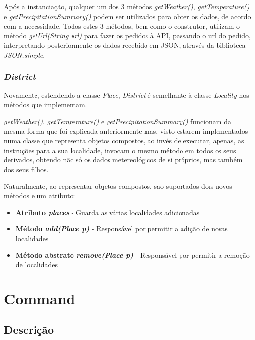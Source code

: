 \documentclass[10pt,portuguese]{article}
\begin{document}
\par Após a instanciação, qualquer um dos 3 métodos \textit{getWeather()}, \textit{getTemperature()} e \textit{getPrecipitationSummary()} podem ser utilizados para obter os dados, de acordo com a necessidade. Todos estes 3 métodos, bem como o construtor, utilizam o método \textit{getUrl(String url)} para fazer os pedidos à API, passando o url do pedido, interpretando posteriormente os dados recebido em JSON, através da biblioteca \textit{JSON.simple}. 

\subsubsection{\textit{District}}

\par Novamente, estendendo a classe \textit{Place}, \textit{District} é semelhante à classe \textit{Locality} nos métodos que implementam.

\par \textit{getWeather()}, \textit{getTemperature()} e \textit{getPrecipitationSummary()} funcionam da mesma forma que foi explicada anteriormente mas, visto estarem implementados numa classe que representa objetos compostos, ao invés de executar, apenas, as instruções para a sua localidade, invocam o mesmo método em todos os seus derivados, obtendo não só os dados metereológicos de si próprios, mas também dos seus filhos. 

\par Naturalmente, ao representar objetos compostos, são suportados dois novos métodos e um atributo:

\begin{itemize}
    \item \textbf{Atributo \textit{places}} - Guarda as várias localidades adicionadas
    \item \textbf{Método \textit{add(Place p)}} - Responsável por permitir a adição de novas localidades
    \item \textbf{Método abstrato \textit{remove(Place p)}} - Responsável por permitir a remoção de localidades
    
\end{itemize}



\clearpage

\section{Command}
\subsection{Descrição}
\end{document}
